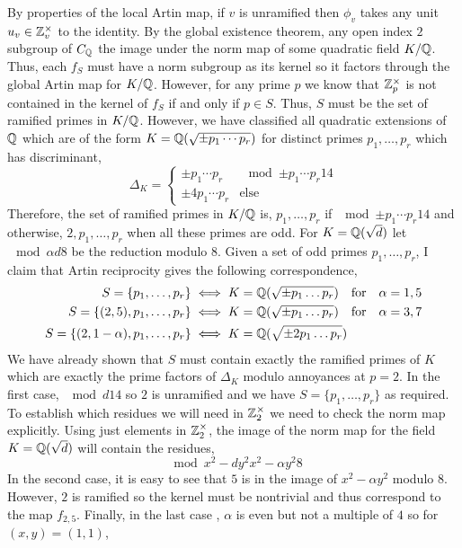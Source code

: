 \documentclass[12pt]{extarticle}
\begin{document}
By properties of the local Artin map, if $v$ is unramified then $\phi_v$ takes any unit $u_v \in \mathbb{Z}_v^\times$ to the identity. By the global existence theorem, any open index $2$ subgroup of $C_{\mathbb{Q}}$ the image under the norm map of some quadratic field $K / \mathbb{Q}$. Thus, each $f_S$ must have a norm subgroup as its kernel so it factors through the global Artin map for $K / \mathbb{Q}$. However, for any prime $p$ we know that $\mathbb{Z}_p^\times$ is not contained in the kernel of $f_S$ if and only if $p \in S$. Thus, $S$ must be the set of ramified primes in $K / \mathbb{Q}$. However, we have classified all quadratic extensions of $\mathbb{Q}$ which are of the form $K = \mathbb{Q}(\sqrt{ \pm p_1 \cdots p_r })$ for distinct primes $p_1, \dots, p_r$ which has discriminant,
\[ \Delta_K = 
\begin{cases}
\pm p_1 \cdots p_r & \mod{\pm p_1 \cdots p_r}{1}{4}
\\
\pm 4 p_1 \cdots p_r & \text{else}
\end{cases}\]
Therefore, the set of ramified primes in $K / \mathbb{Q}$ is, $p_1, \dots, p_r$ if $\mod{\pm p_1 \cdots p_r}{1}{4}$ and otherwise, $2, p_1, \dots, p_r$ when all these primes are odd. For $K = \mathbb{Q}(\sqrt{d})$ let $\mod{\alpha}{d}{8}$ be the reduction modulo $8$. Given a set of odd primes $p_1, \dots, p_r$, I claim that Artin reciprocity gives the following correspondence, 
\begin{align*}
S = \{ p_1, \dots, p_r \} & \iff K = \mathbb{Q}(\sqrt{ \pm p_1 \dots p_r}) \quad \text{for} \quad \alpha = 1,5
\\
S = \{ (2, 5), p_1, \dots, p_r \} & \iff K = \mathbb{Q}(\sqrt{\pm p_1 \dots p_r}) \quad \text{for} \quad \alpha = 3,7
\\
S = \{ (2, 1 - \alpha), p_1, \dots, p_r \} & \iff K = \mathbb{Q}( \sqrt{ \pm 2 p_1 \dots p_r })  
\end{align*}
We have already shown that $S$ must contain exactly the ramified primes of $K$ which are exactly the prime factors of $\Delta_K$ modulo annoyances at $p = 2$. In the first case, $\mod{d}{1}{4}$ so $2$ is unramified and we have $S = \{p_1, \dots, p_r\}$ as required. To establish which residues we will need in $\mathbb{Z}_2^\times$ we need to check the norm map explicitly. Using just elements in $\mathbb{Z}_2^\times$, the image of the norm map for the field $K = \mathbb{Q}(\sqrt{d})$ will contain the residues, 
\[ \mod{x^2 - d y^2}{x^2 - \alpha y^2}{8} \]
In the second case, it is easy to see that $5$ is in the image of $x^2 - \alpha y^2$ modulo $8$. However, $2$ is ramified so the kernel must be nontrivial and thus correspond to the map $f_{2, 5}$. Finally, in the last case , $\alpha$ is even but not a multiple of $4$ so for $(x, y) = (1, 1)$,
\end{document}
